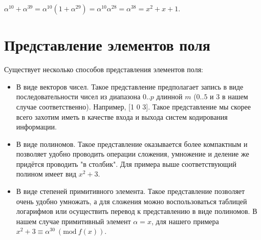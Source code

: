 \documentclass[a4paper,14pt]{extarticle}
\begin{document}
	$\alpha^{10} + \alpha^{39} = \alpha^{10} (1 + \alpha^{29}) = \alpha^{10}\alpha^{28} = \alpha^{38} = x^2 + x + 1$.
	
	\section{Представление элементов поля}
	
	Существует несколько способов представления элементов поля:
	
	\begin{itemize}
		\item В виде векторов чисел. Такое представление предполагает запись в виде последовательности чисел из диапазона $0..p$ длинной $m$ ($0..5$ и 3 в нашем случае соответственно). Например, [1 0 3]. Такое представление мы скорее всего захотим иметь в качестве входа и выхода систем кодирования информации.
		
		\item В виде полиномов. Такое представление оказывается более компактным и позволяет удобно проводить операции сложения, умножение и деление же придётся проводить "в столбик". Для примера выше соответствующий полином имеет вид $x^2 + 3$.
		
		\item В виде степеней примитивного элемента. Такое представление позволяет очень удобно умножать, а для сложения можно воспользоваться таблицей логарифмов или осуществить перевод к представлению в виде полиномов. В нашем случае примитивный элемент $\alpha = x$, для нашего примера $x^2 + 3 \equiv \alpha ^ {30} \ (\textrm{mod}\ f(x))$.
	\end{itemize}
	
\end{document}
